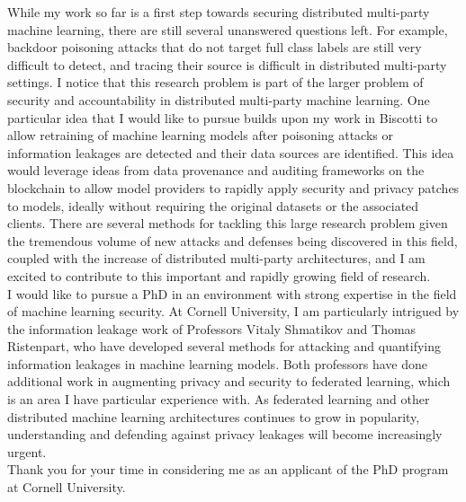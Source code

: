 \documentclass[10pt]{article} %
\begin{document}
While my work so far is a first step towards securing distributed multi-party machine learning, there are still several unanswered questions left. For example, backdoor poisoning attacks that do not target full class labels are still very difficult to detect, and tracing their source is difficult in distributed multi-party settings. I notice that this research problem is part of the larger problem of security and accountability in distributed multi-party machine learning. One particular idea that I would like to pursue builds upon my work in Biscotti to allow retraining of machine learning models after poisoning attacks or information leakages are detected and their data sources are identified. This idea would leverage ideas from data provenance and auditing frameworks on the blockchain to allow model providers to rapidly apply security and privacy patches to models, ideally without requiring the original datasets or the associated clients. There are several methods for tackling this large research problem given the tremendous volume of new attacks and defenses being discovered in this field, coupled with the increase of distributed multi-party architectures, and I am excited to contribute to this important and rapidly growing field of research. \\

I would like to pursue a PhD in an environment with strong expertise in the field of machine learning security. At Cornell University, I am particularly intrigued by the information leakage work of Professors Vitaly Shmatikov and Thomas Ristenpart, who have developed several methods for attacking and quantifying information leakages in machine learning models. Both professors have done additional work in augmenting privacy and security to federated learning, which is an area I have particular experience with. As federated learning and other distributed machine learning architectures continues to grow in popularity, understanding and defending against privacy leakages will become increasingly urgent. \\

Thank you for your time in considering me as an applicant of the PhD program at Cornell University.
\end{document}
